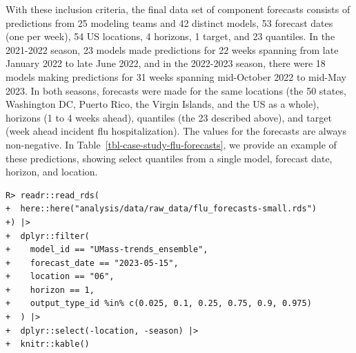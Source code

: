 \documentclass[
  article,
  shortnames,
  notitle]{jss}
\begin{document}
With these inclusion criteria, the final data set of component forecasts
consists of predictions from 25 modeling teams and 42 distinct models,
53 forecast dates (one per week), 54 US locations, 4 horizons, 1 target,
and 23 quantiles. In the 2021-2022 season, 23 models made predictions
for 22 weeks spanning from late January 2022 to late June 2022, and in
the 2022-2023 season, there were 18 models making predictions for 31
weeks spanning mid-October 2022 to mid-May 2023. In both seasons,
forecasts were made for the same locations (the 50 states, Washington
DC, Puerto Rico, the Virgin Islands, and the US as a whole), horizons (1
to 4 weeks ahead), quantiles (the 23 described above), and target (week
ahead incident flu hospitalization). The values for the forecasts are
always non-negative. In Table~\ref{tbl-case-study-flu-forecasts}, we
provide an example of these predictions, showing select quantiles from a
single model, forecast date, horizon, and location.

\begin{verbatim}
R> readr::read_rds(
+  here::here("analysis/data/raw_data/flu_forecasts-small.rds")
+) |>
+  dplyr::filter(
+    model_id == "UMass-trends_ensemble",
+    forecast_date == "2023-05-15",
+    location == "06",
+    horizon == 1,
+    output_type_id %in% c(0.025, 0.1, 0.25, 0.75, 0.9, 0.975)
+  ) |>
+  dplyr::select(-location, -season) |>
+  knitr::kable()
\end{verbatim}
\end{document}
